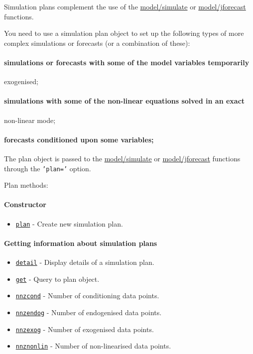 

	Simulation plans complement the use of the \url{model/simulate} or
 \url{model/jforecast} functions.
 
 You need to use a simulation plan object to set up the following types
 of more complex simulations or forecasts (or a combination of these):
 
 \paragraph{simulations or forecasts with some of the model variables
 temporarily}
 
 exogenised;
 
 \paragraph{simulations with some of the non-linear equations solved in
 an exact}
 
 non-linear mode;
 
 \paragraph{forecasts conditioned upon some variables;}
 
 The plan object is passed to the \url{model/simulate} or
 \url{model/jforecast} functions through the \texttt{'plan='} option.
 
 Plan methods:
 
 \paragraph{Constructor}
 
 \begin{itemize}
 \item
   \href{plan/plan}{\texttt{plan}} - Create new simulation plan.
 \end{itemize}
 
 \paragraph{Getting information about simulation plans}
 
 \begin{itemize}
 \item
   \href{plan/detail}{\texttt{detail}} - Display details of a simulation
   plan.
 \item
   \href{plan/get}{\texttt{get}} - Query to plan object.
 \item
   \href{plan/nnzcond}{\texttt{nnzcond}} - Number of conditioning data
   points.
 \item
   \href{plan/nnzendog}{\texttt{nnzendog}} - Number of endogenised data
   points.
 \item
   \href{plan/nnzexog}{\texttt{nnzexog}} - Number of exogenised data
   points.
 \item
   \href{plan/nnznonlin}{\texttt{nnznonlin}} - Number of non-linearised
   data points.
 \end{itemize}
 
